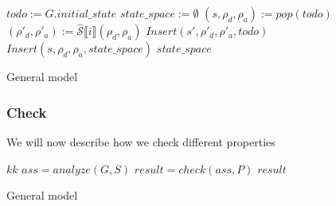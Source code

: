 \begin{algorithm}[htb!]
    \begin{codebox}
        \li $todo := G.initial\_state$
        \li $state\_space := \emptyset$
        \li {}
        \li \Do
        $(s,\rho_d,\rho_a):=pop(todo)$
        \li {}
        \li \Do $(\rho'_d,\rho'_a):=\widehat{\mathcal{S}}\llbracket i\rrbracket(\rho_d,\rho_a)$
        \li {}
        \li \Do $Insert(s',\rho'_d,\rho'_a,todo)$
        \EndIf
        \End
        \li $Insert(s,\rho_d,\rho_a,state\_space)$
        \EndFor
        \End
        \EndWhile
        \End
        \li \Return $state\_space$
    \end{codebox}
    \caption{General model}
    \label{alg:analysis}

\end{algorithm}

\subsubsection{Check}\label{subsubsec:check}

We will now describe how we check different properties

\begin{algorithm}[htb!]
    \begin{codebox}
        \li $kk$
        \li $ass = analyze(G,S)$
        \li $result = check(ass,P)$
        \li \Return $result$
    \end{codebox}
    \caption{General model}
    \label{alg:check}
\end{algorithm}